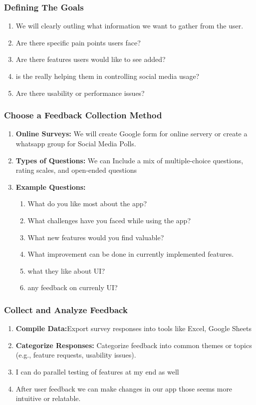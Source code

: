 \documentclass[12pt]{article}
\begin{document}
\begin{itemize}
    \subsubsection{Defining The Goals}
    \begin{enumerate}
        \item We will clearly outling what information we want to gather from the user.
        \item Are there specific pain points users face?
        \item Are there features users would like to see added?
        \item is the really helping them in controlling social media usage?
        \item Are there usability or performance issues?
    \end{enumerate}
    \subsubsection{Choose a Feedback Collection Method}
    \begin{enumerate}
        \item \textbf{Online Surveys:} We will create Google form for online servery or create a whatsapp group for  Social Media Polls.
        \item  \textbf{Types of Questions:} We can Include a mix of multiple-choice questions, rating scales, and open-ended questions
       \item \textbf{Example Questions:}
       \begin{enumerate}
           \item What do you like most about the app?
            \item What challenges have you faced while using the app?
            \item What new features would you find valuable?
            \item What improvement can be done in currently implemented features.
            \item what they like about UI?
            \item any feedback on currenly UI?
       \end{enumerate}
    \end{enumerate}
    \subsubsection{Collect and Analyze Feedback}
    \begin{enumerate}
        \item \textbf{Compile Data:}Export survey responses into tools like Excel, Google Sheets
        \item \textbf{Categorize Responses:}
         Categorize feedback into common themes or topics (e.g., feature requests, usability issues).
       \item I can do parallel testing of features at my end as well
       \item After user feedback we can make changes in our app those seems more intuitive or relatable.
    \end{enumerate}

\end{itemize}
\end{document}
